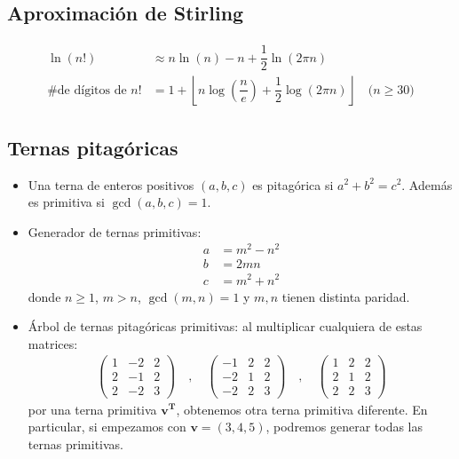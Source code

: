 \documentclass[11pt]{article}
\begin{document}
		\subsection{Aproximación de Stirling}
			\begin{align*}
				\ln(n!) &\approx n\ln(n) - n + \dfrac{1}{2}\ln(2 \pi n) \\
				\text{\# de dígitos de $n!$} &= 1 + \left\lfloor n\log\left(\dfrac{n}{e}\right) + \dfrac{1}{2}\log(2 \pi n) \right\rfloor \quad \text{($n \geq 30$)}
			\end{align*}
		
		\subsection{Ternas pitagóricas}
			\begin{itemize}
				\item Una terna de enteros positivos $(a,b,c)$ es pitagórica si $a^2+b^2=c^2$. Además es primitiva si $\gcd(a,b,c)=1$.
				\item Generador de ternas primitivas:
				\begin{align*}
					a &= m^2-n^2 \\
					b &= 2mn \\
					c &= m^2+n^2
				\end{align*}
				donde $n \geq 1$, $m>n$, $\gcd(m,n)=1$ y $m,n$ tienen distinta paridad.
				\item Árbol de ternas pitagóricas primitivas: al multiplicar cualquiera de estas matrices:
				\begin{align*}
					\begin{pmatrix}
						1 & -2 & 2 \\
						2 & -1 & 2 \\
						2 & -2 & 3
					\end{pmatrix} \quad , \quad
					\begin{pmatrix}
						-1 & 2 & 2 \\
						-2 & 1 & 2 \\
						-2 & 2 & 3
					\end{pmatrix} \quad , \quad
					\begin{pmatrix}
						1 & 2 & 2 \\
						2 & 1 & 2 \\
						2 & 2 & 3
					\end{pmatrix}
				\end{align*}
				por una terna primitiva $\mathbf{v^T}$, obtenemos otra terna primitiva diferente. En particular, si empezamos con $\mathbf{v}=(3,4,5)$, podremos generar todas las ternas primitivas.
			\end{itemize}
	
\end{document}

